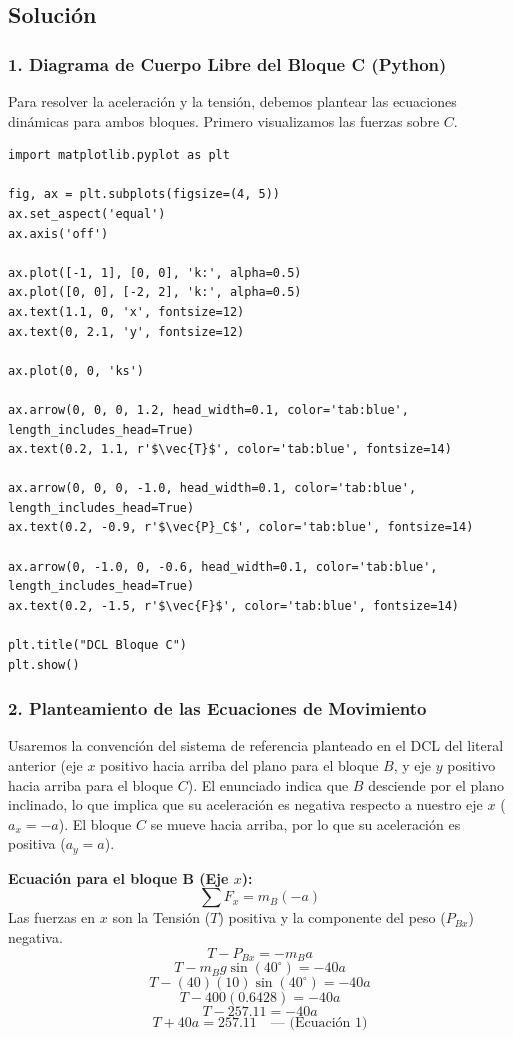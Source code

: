 \documentclass[12pt, a4paper]{article}
\begin{document}
\subsection*{Solución}

\subsubsection*{1. Diagrama de Cuerpo Libre del Bloque C (Python)}
Para resolver la aceleración y la tensión, debemos plantear las ecuaciones dinámicas para ambos bloques. Primero visualizamos las fuerzas sobre $C$.

\begin{lstlisting}
import matplotlib.pyplot as plt

fig, ax = plt.subplots(figsize=(4, 5))
ax.set_aspect('equal')
ax.axis('off')

ax.plot([-1, 1], [0, 0], 'k:', alpha=0.5)
ax.plot([0, 0], [-2, 2], 'k:', alpha=0.5)
ax.text(1.1, 0, 'x', fontsize=12)
ax.text(0, 2.1, 'y', fontsize=12)

ax.plot(0, 0, 'ks')

ax.arrow(0, 0, 0, 1.2, head_width=0.1, color='tab:blue', length_includes_head=True)
ax.text(0.2, 1.1, r'$\vec{T}$', color='tab:blue', fontsize=14)

ax.arrow(0, 0, 0, -1.0, head_width=0.1, color='tab:blue', length_includes_head=True)
ax.text(0.2, -0.9, r'$\vec{P}_C$', color='tab:blue', fontsize=14)

ax.arrow(0, -1.0, 0, -0.6, head_width=0.1, color='tab:blue', length_includes_head=True)
ax.text(0.2, -1.5, r'$\vec{F}$', color='tab:blue', fontsize=14)

plt.title("DCL Bloque C")
plt.show()
\end{lstlisting}

\subsubsection*{2. Planteamiento de las Ecuaciones de Movimiento}
Usaremos la convención del sistema de referencia planteado en el DCL del literal anterior (eje $x$ positivo hacia arriba del plano para el bloque $B$, y eje $y$ positivo hacia arriba para el bloque $C$).
El enunciado indica que $B$ desciende por el plano inclinado, lo que implica que su aceleración es negativa respecto a nuestro eje $x$ ($a_x = -a$). El bloque $C$ se mueve hacia arriba, por lo que su aceleración es positiva ($a_y = a$).

\textbf{Ecuación para el bloque B (Eje $x$):}
$$ \sum F_x = m_B (-a) $$
Las fuerzas en $x$ son la Tensión ($T$) positiva y la componente del peso ($P_{Bx}$) negativa.
$$ T - P_{Bx} = - m_B a $$
$$ T - m_B g \sin(40^\circ) = - 40 a $$
$$ T - (40)(10) \sin(40^\circ) = - 40 a $$
$$ T - 400 (0.6428) = - 40 a $$
$$ T - 257.11 = - 40 a $$
$$ T + 40 a = 257.11 \quad \text{--- (Ecuación 1)} $$
\end{document}
